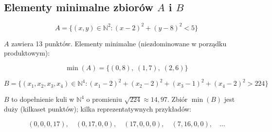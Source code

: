 \documentclass[a4paper,11pt]{article}
\begin{document}
\subsection*{Elementy minimalne zbiorów $A$ i $B$}

\[
  A = \{(x,y)\in\mathbb{N}^2 : (x-2)^2+(y-8)^2 < 5\}
\]

$A$ zawiera 13 punktów. Elementy minimalne (niezdominowane w porządku produktowym):

\[
  \min(A) = \{(0,8),\; (1,7),\; (2,6)\}
\]

\[
  B = \{(x_1,x_2,x_3,x_4)\in\mathbb{N}^4 : (x_1-2)^2+(x_2-2)^2+(x_3-1)^2+(x_4-2)^2 > 224\}
\]

$B$ to dopełnienie kuli w $\mathbb{N}^4$ o promieniu $\sqrt{224}\approx 14{,}97$.
Zbiór $\min(B)$ jest duży (kilkaset punktów); kilka reprezentatywnych przykładów:

\[
  (0,0,0,17),\quad (0,17,0,0),\quad (17,0,0,0),\quad (7,16,0,0),\quad \ldots
\]
\end{document}
